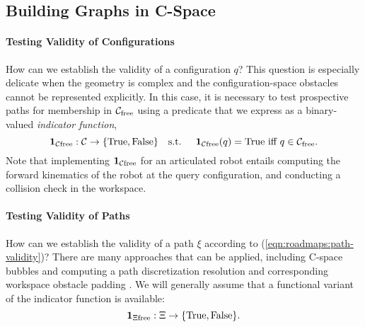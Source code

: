 \subsection{Building Graphs in C-Space}
\label{subsec:roadmaps:building-graphs}

\paragraph{Testing Validity of Configurations}
How can we establish the validity of a configuration $q$?
This question is especially delicate when the geometry is complex
and the configuration-space obstacles cannot be represented explicitly.
In this case,
it is necessary to test prospective paths
for membership in $\mathcal{C}_{\mbox{\scriptsize free}}$ using a predicate
that we express as a binary-valued
\emph{indicator function},
\begin{equation}
   \mathbf{1}_{\mathcal{C}\mbox{\scriptsize free}} : \mathcal{C} \rightarrow
      \{ \mbox{True}, \mbox{False} \} 
   \mbox{\quad s.t. \quad}
   \mathbf{1}_{\mathcal{C}\mbox{\scriptsize free}}(q) = \mbox{True} \mbox{ iff } q \in \mathcal{C}_{\mbox{\scriptsize free}}.
\end{equation}
Note that implementing $\mathbf{1}_{\mathcal{C}\mbox{\scriptsize free}}$ for an articulated robot
entails computing the forward kinematics of the robot at the
query configuration,
and conducting a collision check in the workspace.

\paragraph{Testing Validity of Paths}
How can we establish the validity of a path $\xi$
according to (\ref{eqn:roadmaps:path-validity})?
There are many approaches that can be applied,
including C-space bubbles \citep{quinlan1994modification}
and computing a path discretization resolution and corresponding
workspace obstacle padding
\citep{barraquand1991distributedrepresentation}.
We will generally assume that a functional variant of the indicator
function is available:%
%
\begin{equation}
   \mathbf{1}_{\Xi\mbox{\scriptsize free}} : \Xi \rightarrow
      \{ \mbox{True}, \mbox{False} \} .
\end{equation}

